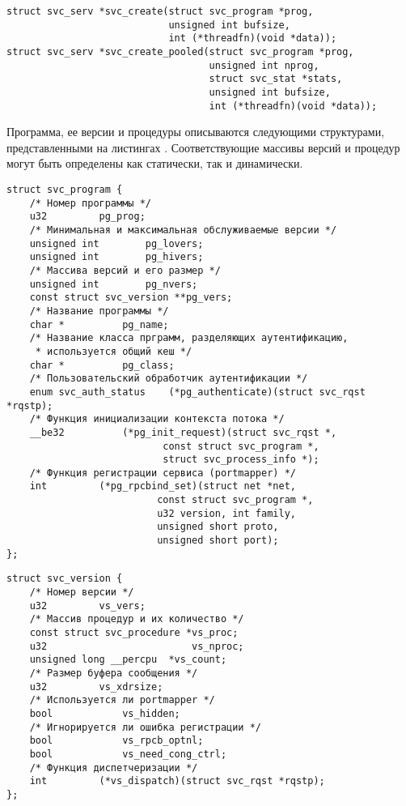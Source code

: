 \begin{lstlisting}[caption={Создание сервиса}, label={lst:svc_create}]
struct svc_serv *svc_create(struct svc_program *prog,
                            unsigned int bufsize,
                            int (*threadfn)(void *data));
struct svc_serv *svc_create_pooled(struct svc_program *prog,
                                   unsigned int nprog,
                                   struct svc_stat *stats,
                                   unsigned int bufsize,
                                   int (*threadfn)(void *data));
\end{lstlisting}

Программа, ее версии и процедуры описываются следующими структурами,
представленными на листингах
. Соответствующие
массивы версий и процедур могут быть определены как статически, так и
динамически.

\begin{lstlisting}[caption={Структура программы}, label={lst:struct_svc_program}]
struct svc_program {
    /* Номер программы */
    u32         pg_prog;
    /* Минимальная и максимальная обслуживаемые версии */
    unsigned int        pg_lovers;
    unsigned int        pg_hivers;
    /* Массива версий и его размер */
    unsigned int        pg_nvers;
    const struct svc_version **pg_vers;
    /* Название программы */
    char *          pg_name;
    /* Название класса прграмм, разделяющих аутентификацию,
     * используется общий кеш */
    char *          pg_class;
    /* Пользовательский обработчик аутентификации */
    enum svc_auth_status    (*pg_authenticate)(struct svc_rqst *rqstp);
    /* Функция инициализации контекста потока */
    __be32          (*pg_init_request)(struct svc_rqst *,
                           const struct svc_program *,
                           struct svc_process_info *);
    /* Функция регистрации сервиса (portmapper) */
    int         (*pg_rpcbind_set)(struct net *net,
                          const struct svc_program *,
                          u32 version, int family,
                          unsigned short proto,
                          unsigned short port);
};
\end{lstlisting}

\begin{lstlisting}[caption={Структура версии}, label={lst:struct_svc_version}]
struct svc_version {
    /* Номер версии */
    u32         vs_vers;
    /* Массив процедур и их количество */
    const struct svc_procedure *vs_proc;
    u32                         vs_nproc;
    unsigned long __percpu  *vs_count;
    /* Размер буфера сообщения */
    u32         vs_xdrsize;
    /* Используется ли portmapper */
    bool            vs_hidden;
    /* Игнорируется ли ошибка регистрации */
    bool            vs_rpcb_optnl;
    bool            vs_need_cong_ctrl;
    /* Функция диспетчеризации */
    int         (*vs_dispatch)(struct svc_rqst *rqstp);
};
\end{lstlisting}

